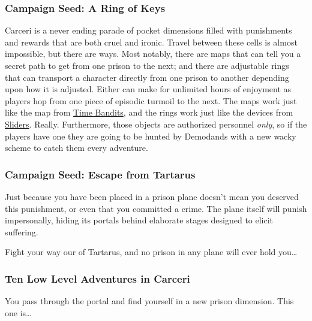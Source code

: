\subsubsection{Campaign Seed: A Ring of Keys}

Carceri is a never ending parade of pocket dimensions filled with punishments and rewards that are both cruel and ironic. Travel between these cells is almost impossible, but there are ways. Most notably, there are maps that can tell you a secret path to get from one prison to the next; and there are adjustable rings that can transport a character directly from one prison to another depending upon how it is adjusted. Either can make for unlimited hours of enjoyment as players hop from one piece of episodic turmoil to the next. The maps work just like the map from \underline{Time Bandits}, and the rings work just like the devices from \underline{Sliders}. Really. Furthermore, those objects are authorized personnel \textit{only}, so if the players have one they are going to be hunted by Demodands with a new wacky scheme to catch them every adventure.

\subsubsection{Campaign Seed: Escape from Tartarus}

Just because you have been placed in a prison plane doesn't mean you deserved this punishment, or even that you committed a crime. The plane itself will punish impersonally, hiding its portals behind elaborate stages designed to elicit suffering.

Fight your way our of Tartarus, and no prison in any plane will ever hold you\ldots

\subsubsection{Ten Low Level Adventures in Carceri}

You pass through the portal and find yourself in a new prison dimension. This one is\ldots

